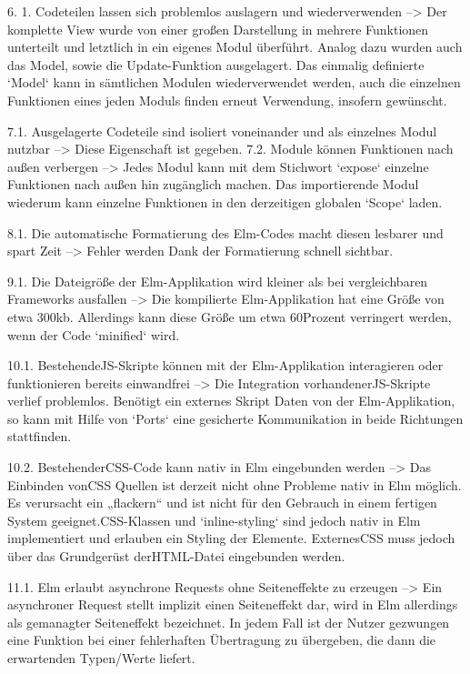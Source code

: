  6. 1. Codeteilen lassen sich problemlos auslagern und wiederverwenden
 --> Der komplette View wurde von einer großen Darstellung in mehrere Funktionen unterteilt und letztlich in ein eigenes Modul überführt. Analog dazu wurden auch das Model, sowie die Update-Funktion ausgelagert. Das einmalig definierte `Model` kann in sämtlichen Modulen wiederverwendet werden, auch die einzelnen Funktionen eines jeden Moduls finden erneut Verwendung, insofern gewünscht.
 
 7.1. Ausgelagerte Codeteile sind isoliert voneinander und als einzelnes Modul nutzbar
 --> Diese Eigenschaft ist gegeben.
 7.2. Module können Funktionen nach außen verbergen
 --> Jedes Modul kann mit dem Stichwort `expose` einzelne Funktionen nach außen hin zugänglich machen. Das importierende Modul wiederum kann einzelne Funktionen in den derzeitigen globalen `Scope` laden.
 
 8.1. Die automatische Formatierung des Elm-Codes macht diesen lesbarer und spart Zeit
 --> Fehler werden Dank der Formatierung schnell sichtbar.
 
 9.1. Die Dateigröße der Elm-Applikation wird kleiner als bei vergleichbaren Frameworks ausfallen
 --> Die kompilierte Elm-Applikation hat eine Größe von etwa 300kb. Allerdings kann diese Größe um etwa 60Prozent verringert werden, wenn der Code `minified` wird.

10.1. Bestehende\ac{JS}-Skripte können mit der Elm-Applikation interagieren oder funktionieren bereits einwandfrei
--> Die Integration vorhandener\ac{JS}-Skripte verlief problemlos. Benötigt ein externes Skript Daten von der Elm-Applikation, so kann mit Hilfe von `Ports` eine gesicherte Kommunikation in beide Richtungen stattfinden.

10.2. Bestehender\ac{CSS}-Code kann nativ in Elm eingebunden werden
--> Das Einbinden von\ac{CSS} Quellen ist derzeit nicht ohne Probleme nativ in Elm möglich. Es verursacht ein „flackern“ und ist nicht für den Gebrauch in einem fertigen System geeignet.\ac{CSS}-Klassen und `inline-styling` sind jedoch nativ in Elm implementiert und erlauben ein Styling der Elemente. Externes\ac{CSS} muss jedoch über das Grundgerüst der\ac{HTML}-Datei eingebunden werden.

11.1. Elm erlaubt asynchrone Requests ohne Seiteneffekte zu erzeugen
--> Ein asynchroner Request stellt implizit einen Seiteneffekt dar, wird in Elm allerdings als gemanagter Seiteneffekt bezeichnet. In jedem Fall ist der Nutzer gezwungen eine Funktion bei einer fehlerhaften Übertragung zu übergeben, die dann die erwartenden Typen/Werte liefert.

